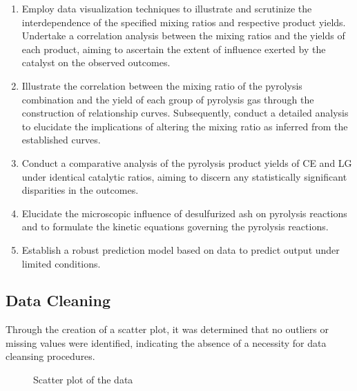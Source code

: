 \documentclass{swmcmthesis}
\begin{document}
\begin{enumerate}
\item Employ data visualization techniques to illustrate and scrutinize the interdependence of the specified mixing ratios and respective product yields. Undertake a correlation analysis between the mixing ratios and the yields of each product, aiming to ascertain the extent of influence exerted by the catalyst on the observed outcomes.
\item Illustrate the correlation between the mixing ratio of the pyrolysis combination and the yield of each group of pyrolysis gas through the construction of relationship curves. Subsequently, conduct a detailed analysis to elucidate the implications of altering the mixing ratio as inferred from the established curves.
\item Conduct a comparative analysis of the pyrolysis product yields of CE and LG under identical catalytic ratios, aiming to discern any statistically significant disparities in the outcomes.
\item Elucidate the microscopic influence of desulfurized ash on pyrolysis reactions and to formulate the kinetic equations governing the pyrolysis reactions.
\item Establish a robust prediction model based on data to predict output under limited conditions.
\end{enumerate}

\subsection{Data Cleaning}

Through the creation of a scatter plot, it was determined that no outliers or missing values were identified, indicating the absence of a necessity for data cleansing procedures.
\begin{figure}[h!t]
    \centering
    \hfill
    \caption{Scatter plot of the data}
\end{figure}
\end{document}
